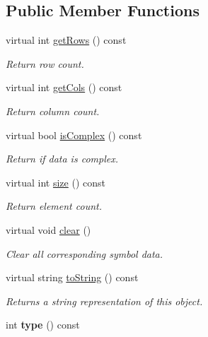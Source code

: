 \subsection*{Public Member Functions}
\begin{DoxyCompactItemize}
\item 
virtual int \hyperlink{class_g_e_symbol_a0bfeb930f9141b3bd57309c1f62aa6c8}{get\+Rows} () const
\begin{DoxyCompactList}\small\item\em Return row count. \end{DoxyCompactList}\item 
virtual int \hyperlink{class_g_e_symbol_a0e4ad5b8d047245375b4219ba289a02d}{get\+Cols} () const
\begin{DoxyCompactList}\small\item\em Return column count. \end{DoxyCompactList}\item 
virtual bool \hyperlink{class_g_e_symbol_a094de5283480bcfc9dd98f116ef3922b}{is\+Complex} () const
\begin{DoxyCompactList}\small\item\em Return if data is complex. \end{DoxyCompactList}\item 
virtual int \hyperlink{class_g_e_symbol_a534b11b49a640420aaca9433db0c6479}{size} () const
\begin{DoxyCompactList}\small\item\em Return element count. \end{DoxyCompactList}\item 
virtual void \hyperlink{class_g_e_symbol_a39d2e523aec771a73e1cc5d7a9618b88}{clear} ()
\begin{DoxyCompactList}\small\item\em Clear all corresponding symbol data. \end{DoxyCompactList}\item 
virtual string \hyperlink{class_g_e_symbol_a5c0d4c23b20574c28bddfe234409aa37}{to\+String} () const
\begin{DoxyCompactList}\small\item\em Returns a string representation of this object. \end{DoxyCompactList}\item 
\mbox{\label{class_g_e_symbol_a73a71b9e1b7376d4791d24aca20737b6}} 
int {\bfseries type} () const
\end{DoxyCompactItemize}
